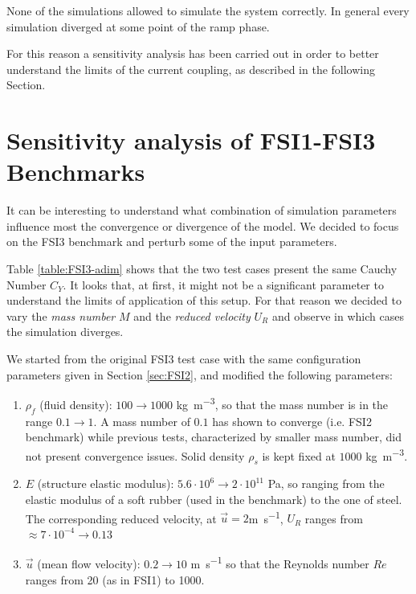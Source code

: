None of the simulations allowed to simulate the system correctly. In general every simulation diverged at some point of the ramp phase.

For this reason a sensitivity analysis has been carried out in order to better understand the limits of the current coupling, as described in the following Section.


\section{Sensitivity analysis of FSI1-FSI3 Benchmarks}
\label{sec:FSI3-sensitivity}

It can be interesting to understand what combination of simulation parameters influence most the convergence or divergence of the model. We decided to focus on the FSI3 benchmark and perturb some of the input parameters.

Table \ref{table:FSI3-adim} shows that the two test cases present the same Cauchy Number $C_Y$. It looks that, at first, it might not be a significant parameter to understand the limits of application of this setup. For that reason we decided to vary the \textit{mass number} $M$ and the \textit{reduced velocity} $U_R$ and observe in which cases the simulation diverges.

We started from the original FSI3 test case with the same configuration parameters given in Section \ref{sec:FSI2}, and modified the following parameters:

\begin{enumerate}
    \item $\rho_f$ (fluid density): $100\rightarrow1000$ \si{kg.m^{-3}}, so that the mass number is in the range $0.1\rightarrow1$. A mass number of $0.1$ has shown to converge (i.e. FSI2 benchmark) while previous tests, characterized by smaller mass number, did not present convergence issues. Solid density $\rho_s$ is kept fixed at $1000$ \si{kg.m^{-3}}. 
    \item $E$ (structure elastic modulus): $5.6\cdot10^{6}\rightarrow2\cdot10^{11}$ \si{Pa}, so ranging from the elastic modulus of a soft rubber (used in the benchmark) to the one of steel. The corresponding reduced velocity, at $\vec{u}=2$\si{m.s^{-1}}, $U_R$ ranges from $\approx7\cdot10^{-4}\rightarrow0.13 $
    \item $\vec{u}$ (mean flow velocity): $0.2\rightarrow10$ \si{m.s^{-1}} so that the Reynolds number $Re$ ranges from 20 (as in FSI1) to 1000.
\end{enumerate}

